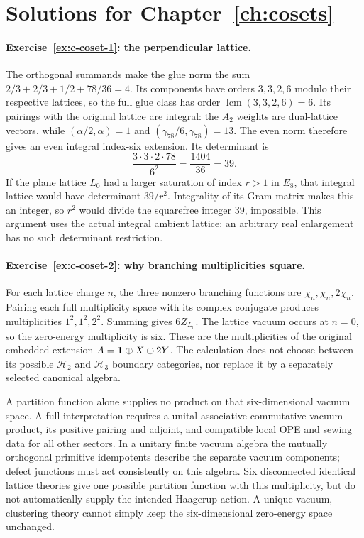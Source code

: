\section{Solutions for Chapter~\ref{ch:cosets}}

\paragraph{Exercise~\ref{ex:c-coset-1}: the perpendicular lattice.}
\label{sol:ex:c-coset-1}
The orthogonal summands make the glue norm the sum
$2/3+2/3+1/2+78/36=4$. Its components have orders
$3,3,2,6$ modulo their respective lattices, so the full glue
class has order $\operatorname{lcm}(3,3,2,6)=6$.
Its pairings with the original lattice are integral: the
$A_2$ weights are dual-lattice vectors, while
$(\alpha/2,\alpha)=1$ and $(\gamma_{78}/6,\gamma_{78})=13$.
The even norm therefore gives an even integral index-six extension.
Its determinant is
\[
 \frac{3\cdot3\cdot2\cdot78}{6^2}
 =\frac{1404}{36}=39.
\]
If the plane lattice $L_0$ had a larger saturation of index
$r>1$ in $E_8$, that integral lattice would have determinant
$39/r^2$. Integrality of its Gram matrix makes this an integer,
so $r^2$ would divide the squarefree integer $39$, impossible.
This argument uses the actual integral ambient lattice; an
arbitrary real enlargement has no such determinant restriction.



\paragraph{Exercise~\ref{ex:c-coset-2}: why branching multiplicities square.}
\label{sol:ex:c-coset-2}
For each lattice charge $n$, the three nonzero branching functions
are $\chi_n,\chi_n,2\chi_n$. Pairing each full multiplicity
space with its complex conjugate produces multiplicities
$1^2,1^2,2^2$. Summing gives $6Z_{L_0}$. The lattice vacuum
occurs at $n=0$, so the zero-energy multiplicity is six.
These are the multiplicities of the original embedded extension
$A=\mathbf1\oplus X\oplus2Y$. The calculation does not choose between
its possible $\mathcal H_2$ and $\mathcal H_3$ boundary categories,
nor replace it by a separately selected canonical algebra.

A partition function alone supplies no product on that
six-dimensional vacuum space. A full interpretation requires
a unital associative commutative vacuum product, its positive pairing and
adjoint, and compatible local OPE and sewing data for all other
sectors. In a unitary finite vacuum algebra the mutually orthogonal
primitive idempotents describe the separate vacuum components;
defect junctions must act consistently on this algebra. Six
disconnected identical lattice theories give one possible partition
function with this multiplicity, but do not automatically supply
the intended Haagerup action. A unique-vacuum, clustering theory
cannot simply keep the six-dimensional zero-energy space unchanged.



